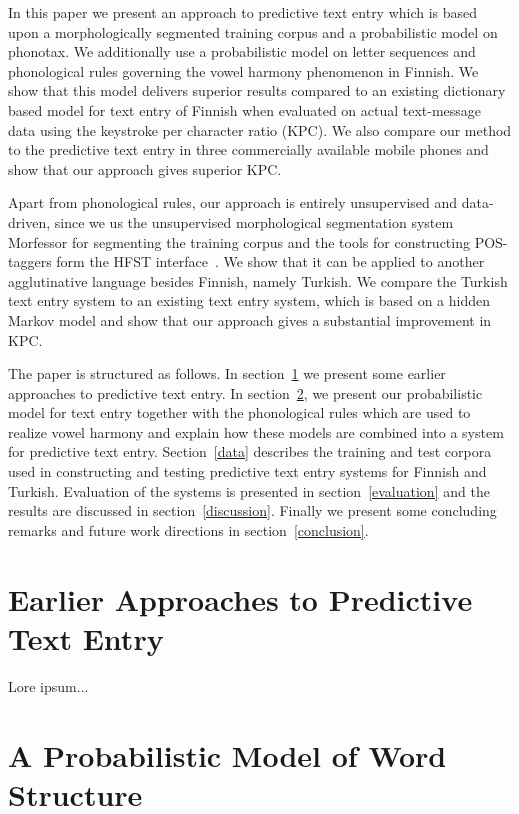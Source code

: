 \documentclass{llncs}
\begin{document}
In this paper we present an approach to predictive text entry which is
based upon a morphologically segmented training corpus and a
probabilistic model on phonotax. We additionally use a probabilistic
model on letter sequences and phonological rules governing the vowel
harmony phenomenon in Finnish. We show that this model delivers
superior results compared to an existing dictionary based model for
text entry of Finnish when evaluated on actual text-message data using
the keystroke per character ratio (KPC). We also compare our method to
the predictive text entry in three commercially available mobile
phones and show that our approach gives superior KPC.

Apart from phonological rules, our approach is entirely unsupervised
and data-driven, since we us the unsupervised morphological
segmentation system Morfessor \cite{Creutz07ACMTSLP} for segmenting
the training corpus and the tools for constructing POS-taggers form the HFST interface~\cite{hfst/2011}. We show that it can be applied to another
agglutinative language besides Finnish, namely Turkish. We compare the
Turkish text entry system to an existing text entry system, which is
based on a hidden Markov model and show that our approach gives a
substantial improvement in KPC.

The paper is structured as follows. In section~\ref{earlier-work} we
present some earlier approaches to predictive text entry. In
section~\ref{model}, we present our probabilistic model for text entry
together with the phonological rules which are used to realize vowel
harmony and explain how these models are combined into a system for
predictive text entry. Section~\ref{data} describes the training and
test corpora used in constructing and testing predictive text entry
systems for Finnish and Turkish. Evaluation of the systems is
presented in section~\ref{evaluation} and the results are discussed in
section~\ref{discussion}. Finally we present some concluding remarks
and future work directions in section~\ref{conclusion}.

\section{Earlier Approaches to Predictive Text Entry}\label{earlier-work}

Lore ipsum...

\section{A Probabilistic Model of Word Structure}\label{model}
\end{document}
